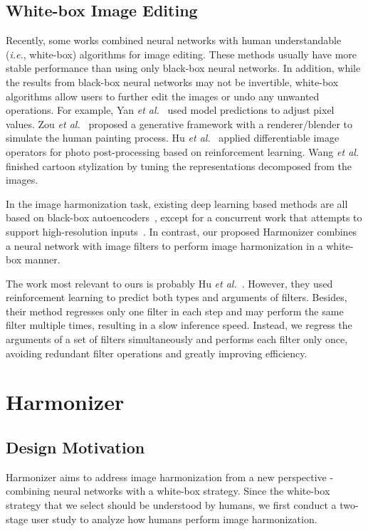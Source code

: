 \documentclass[runningheads]{llncs}
\newcommand{\ke}[1]{{\color{black}#1}}
\begin{document}
\subsection{White-box Image Editing}

Recently, some works combined neural networks with human understandable ({\it i.e.}, white-box) algorithms for image editing. These methods usually have more stable performance than using only black-box neural networks. In addition, while the results from black-box neural networks may not be invertible, white-box algorithms allow users to further edit the images or undo any unwanted operations. For example, Yan {\it et al.}~\cite{Yan2016AutomaticPA} used model predictions to adjust pixel values.
Zou {\it et al.}~\cite{zou2020stylized} proposed a generative framework with a renderer/blender to simulate the human painting process. Hu {\it et al.}~\cite{Exposure} applied differentiable image operators for photo post-processing based on reinforcement learning. Wang {\it et al.}~\cite{LearnCartoonize} finished cartoon stylization by tuning the representations decomposed from the images.

In the image harmonization task, existing deep learning based methods are all based on black-box autoencoders~\cite{DIH,DoveNet,BargainNet,RAIN,IntrinsicIH,TransformerIH}, except for a concurrent work that attempts to support high-resolution inputs~\cite{concwork}. In contrast, our proposed Harmonizer combines a neural network with image filters to perform image harmonization in a white-box manner.

\ke{
The work most relevant to ours is probably Hu {\it et al.}~\cite{Exposure}. 
However, they used reinforcement learning to predict both types and arguments of filters. Besides, their method regresses only one filter in each step and may perform the same filter multiple times, resulting in a slow inference speed. 
Instead, we regress the arguments of a set of filters simultaneously and performs each filter only once, avoiding redundant filter operations and greatly improving efficiency.
}







\section{Harmonizer}

\subsection{Design Motivation}
Harmonizer aims to address image harmonization from a new perspective - combining neural networks with a white-box strategy. Since the white-box strategy that we select should be understood by humans, we first conduct a two-stage user study to analyze how humans perform image harmonization. 
\end{document}
